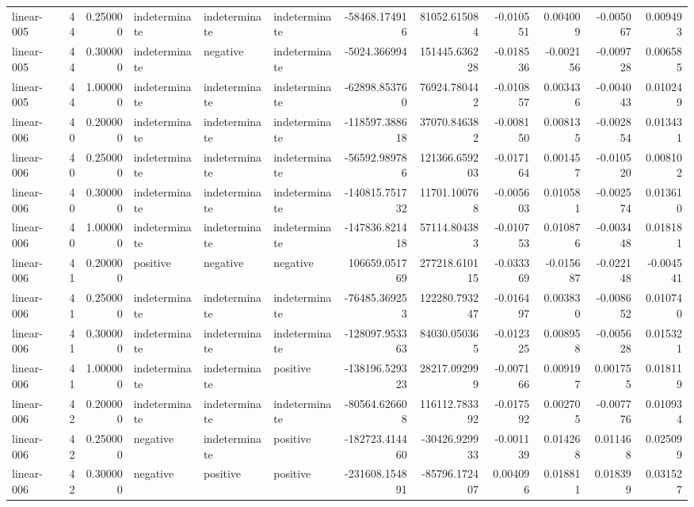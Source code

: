 \begin{tabular}{lrrlllrrrrrr}
linear-005 & 44 & 0.250000 & indeterminate & indeterminate & indeterminate & -58468.174916 & 81052.615084 & -0.010551 & 0.004009 & -0.005067 & 0.009493 \\
linear-005 & 44 & 0.300000 & indeterminate & negative & indeterminate & -5024.366994 & 151445.636228 & -0.018536 & -0.002156 & -0.009728 & 0.006585 \\
linear-005 & 44 & 1.000000 & indeterminate & indeterminate & indeterminate & -62898.853760 & 76924.780442 & -0.010857 & 0.003436 & -0.004043 & 0.010249 \\
linear-006 & 40 & 0.200000 & indeterminate & indeterminate & indeterminate & -118597.388618 & 37070.846382 & -0.008150 & 0.008135 & -0.002854 & 0.013431 \\
linear-006 & 40 & 0.250000 & indeterminate & indeterminate & indeterminate & -56592.989786 & 121366.659203 & -0.017164 & 0.001457 & -0.010520 & 0.008102 \\
linear-006 & 40 & 0.300000 & indeterminate & indeterminate & indeterminate & -140815.751732 & 11701.100768 & -0.005603 & 0.010581 & -0.002574 & 0.013610 \\
linear-006 & 40 & 1.000000 & indeterminate & indeterminate & indeterminate & -147836.821418 & 57114.804383 & -0.010753 & 0.010876 & -0.003448 & 0.018181 \\
linear-006 & 41 & 0.200000 & positive & negative & negative & 106659.051769 & 277218.610115 & -0.033369 & -0.015687 & -0.022148 & -0.004541 \\
linear-006 & 41 & 0.250000 & indeterminate & indeterminate & indeterminate & -76485.369253 & 122280.793247 & -0.016497 & 0.003830 & -0.008652 & 0.010740 \\
linear-006 & 41 & 0.300000 & indeterminate & indeterminate & indeterminate & -128097.953363 & 84030.050365 & -0.012325 & 0.008958 & -0.005628 & 0.015321 \\
linear-006 & 41 & 1.000000 & indeterminate & indeterminate & positive & -138196.529323 & 28217.092999 & -0.007166 & 0.009197 & 0.001755 & 0.018119 \\
linear-006 & 42 & 0.200000 & indeterminate & indeterminate & indeterminate & -80564.626608 & 116112.783392 & -0.017592 & 0.002705 & -0.007776 & 0.010934 \\
linear-006 & 42 & 0.250000 & negative & indeterminate & positive & -182723.414460 & -30426.929933 & -0.001139 & 0.014268 & 0.011468 & 0.025099 \\
linear-006 & 42 & 0.300000 & negative & positive & positive & -231608.154891 & -85796.172407 & 0.004096 & 0.018811 & 0.018399 & 0.031527 \\

\end{tabular}
